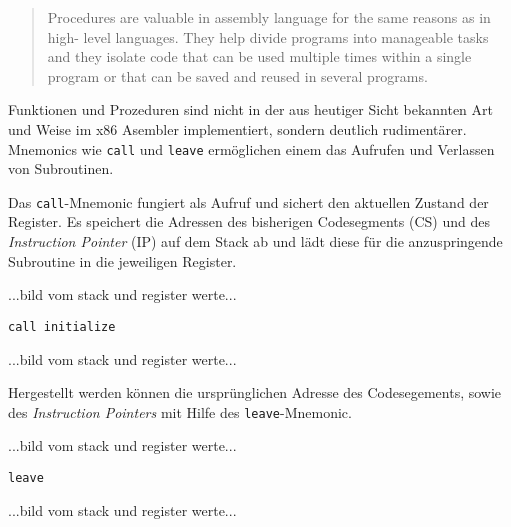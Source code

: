 \begin{quote}Procedures are valuable in assembly language for the same reasons as in high-
level languages. They help divide programs into manageable tasks and they isolate code
that can be used multiple times within a single program or that can be saved and reused
in several programs.
\end{quote}

Funktionen und Prozeduren sind nicht in der aus heutiger Sicht bekannten Art und Weise im x86 Asembler implementiert, sondern deutlich rudimentärer.
Mnemonics wie \texttt{call} und \texttt{leave} ermöglichen einem das Aufrufen und Verlassen von Subroutinen.

Das \texttt{call}-Mnemonic fungiert als Aufruf und sichert den aktuellen Zustand der Register.
Es speichert die Adressen des bisherigen Codesegments (CS) und des \textit{Instruction Pointer} (IP) auf dem Stack ab und lädt diese für die anzuspringende Subroutine in die jeweiligen Register.

...bild vom stack und register werte...
\begin{verbatim}call initialize\end{verbatim}
...bild vom stack und register werte...

Hergestellt werden können die ursprünglichen Adresse des Codesegements, sowie des \textit{Instruction Pointers} mit Hilfe des \texttt{leave}-Mnemonic.

...bild vom stack und register werte...
\begin{verbatim}leave \end{verbatim}
...bild vom stack und register werte...
